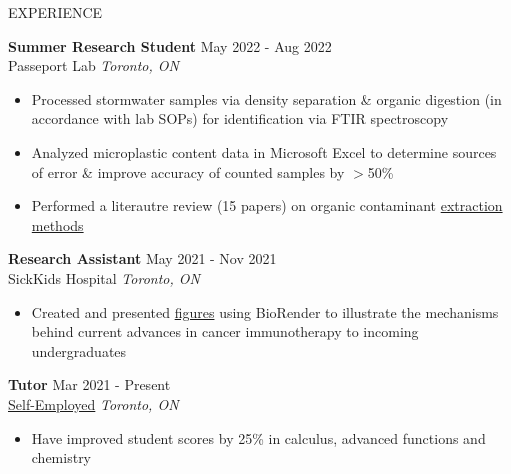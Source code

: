 \documentclass{resume} %
\begin{document}
\begin{rSection}{EXPERIENCE}

\textbf{Summer Research Student} \hfill May 2022 - Aug 2022\\
Passeport Lab \hfill \textit{Toronto, ON}
\vspace{-0.2cm}
 \begin{itemize}
    \itemsep -8pt {} 
    \item Processed stormwater samples via density separation \& organic digestion (in accordance with lab SOPs) for identification via FTIR spectroscopy
   \item Analyzed microplastic content data in Microsoft Excel to determine sources of error \& improve accuracy of counted samples by $>$50\% 
    \item Performed a literautre review (15 papers) on organic contaminant \href{https://drive.google.com/file/d/1tVPh5Zt4zLT8spiLfzJ4vu0XZSuMfOfu/view}{extraction methods}
 \end{itemize}
 
\textbf{Research Assistant} \hfill May 2021 - Nov 2021\\
SickKids Hospital \hfill \textit{Toronto, ON}
\vspace{-0.2cm}
 \begin{itemize}
    \itemsep -8pt {} 
     \item Created and presented \href{https://drive.google.com/file/d/1459llsxjfB4-UA4sHfnBQ7wem0znVUL5/view?usp=sharing}{figures} using BioRender to illustrate the mechanisms behind current advances in cancer immunotherapy to incoming undergraduates
 \end{itemize}

\textbf{Tutor} \hfill Mar 2021 - Present \\
\href{https://www.overleaf.com/read/qybvrsfbsbwq}{Self-Employed} \hfill \textit{Toronto, ON} 
\vspace{-0.2cm}
\begin{itemize}
   \itemsep -8pt {} 
   \item  Have improved student scores by 25\% in calculus, advanced functions and chemistry 
\end{itemize}
\end{rSection} 
\end{document}
